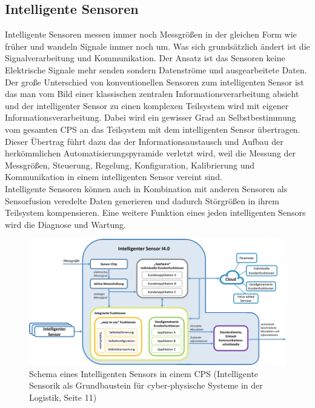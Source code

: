 \documentclass[a4paper,12pt]{scrartcl}
\begin{document}
\subsection{Intelligente Sensoren}
Intelligente Sensoren messen immer noch Messgrößen in der gleichen Form wie früher und wandeln Signale immer noch um. Was sich grundsätzlich ändert ist die Signalverarbeitung und Kommunikation. Der Ansatz ist das Sensoren keine Elektrische Signale mehr senden sondern Datenströme und ausgearbeitete Daten.\\
Der große Unterschied von konventionellen Sensoren zum intelligenten Sensor ist das man vom Bild einer klassischen zentralen Informationsverarbeitung absieht und der intelligenter Sensor zu einen komplexen Teilsystem wird mit eigener Informationsverarbeitung.
Dabei wird ein gewisser Grad an Selbstbestimmung vom gesamten CPS an das Teilsystem mit dem intelligenten Sensor übertragen. Dieser Übertrag führt dazu das der Informationsaustausch und Aufbau der herkömmlichen Automatisierungspyramide verletzt wird, weil die Messung der Messgrößen, Steuerung,  Regelung, Konfiguration, Kalibrierung und Kommunikation in einem intelligenten Sensor vereint sind.\\
Intelligente Sensoren können auch in Kombination mit anderen Sensoren als Sensorfusion veredelte Daten generieren und dadurch Störgrößen in ihrem Teilsystem kompensieren. Eine weitere Funktion eines jeden intelligenten Sensors wird die Diagnose und Wartung.\cite{[2] Seite 9 ff}
\vspace{0.5cm}
\begin{figure}[H]
\centering
\includegraphics[scale=0.9]{picture/IntelligenterSensorSchema}
  \caption{Schema eines Intelligenten Sensors in einem CPS (Intelligente Sensorik als Grundbaustein für cyber-physische Systeme in der Logistik, Seite 11)}
 \label{fig:Schema eines Intelligenten Sensors in einem CPS } 
\end{figure}
\end{document}
